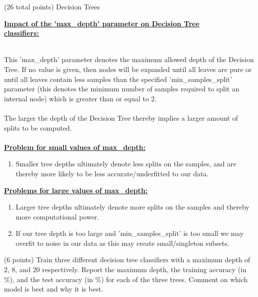 \documentclass[12pt]{article}
\begin{document}
\begin{question}{(26 total points) Decision Trees}
\begin{subquestion}
\begin{answerbox}{32em}
\large{\textbf{\underline{Impact of the 'max\_depth' parameter on Decision Tree}}}\\
\large{\textbf{\underline{classifiers:}}}\\
\\
\normalsize{
This 'max\_depth' parameter denotes the maximum allowed depth of the Decision Tree. If no value is given, then nodes will be expanded until all leaves are pure or until all leaves contain less samples than the specified 'min\_samples\_split' parameter (this denotes the minimum number of samples required to split an internal node) which is greater than or equal to 2.\\
\\
The larger the depth of the Decision Tree thereby implies a larger amount of splits to be computed.\\
\\
\textbf{\underline{Problem for small values of max\_depth:}}
\begin{enumerate}
    \item Smaller tree depths ultimately denote less splits on the samples, and are thereby more likely to be less accurate/underfitted to our data.\\
\end{enumerate}
\textbf{\underline{Problems for large values of max\_depth:}}
\begin{enumerate}
    \item Larger tree depths ultimately denote more splits on the samples and thereby more computational power.
    \item If our tree depth is too large and 'min\_samples\_split' is too small we may overfit to noise in our data as this may create small/singleton subsets.
\end{enumerate}
}
\end{answerbox}



\end{subquestion}


%
%
\begin{subquestion}{(6 points) 
Train three different decision tree classifiers with a maximum depth of 2, 8, and 20 respectively.
Report the maximum depth, the training accuracy (in \%), and the test accuracy (in \%) for each of the three trees.
Comment on which model is best and why it is best. \\
}



\end{subquestion}
\end{question}
\end{document}
